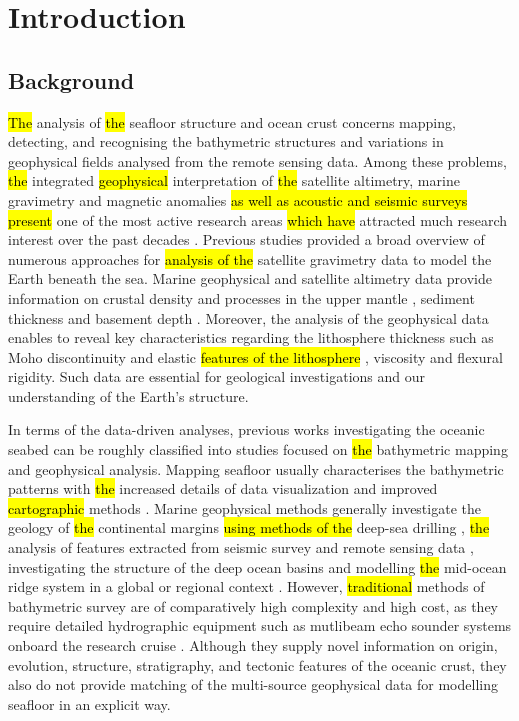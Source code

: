 \documentclass[geomatics,article,submit,pdftex,moreauthors]{Definitions/mdpi}
\begin{document}
\section{Introduction}

\subsection{Background}
\hl{The }analysis of \hl{the} seafloor structure and ocean crust concerns mapping, detecting, and recognising the bathymetric structures and variations in geophysical fields analysed from the remote sensing data. Among these problems, \hl{the }integrated \hl{geophysical} interpretation of \hl{the }satellite altimetry, marine gravimetry and magnetic anomalies \hl{as well as acoustic and seismic surveys present }one of the most active research areas \hl{which have} attracted much research interest over the past decades \cite{Bascou}. Previous studies \cite{ESHAGH2021313} provided a broad overview of numerous approaches for \hl{analysis of the} satellite gravimetry data to model the Earth beneath the sea. Marine geophysical and satellite altimetry data provide information on crustal density and processes in the upper mantle \cite{KAPAWAR2021106692,PENG2022110823,ZHANG202368}, sediment thickness and basement depth \cite{Lemenkova202005}. Moreover, the analysis of the geophysical data enables to reveal key characteristics regarding the lithosphere thickness such as Moho discontinuity and elastic \hl{features of the lithosphere} \cite{TESAURO201378}, viscosity and flexural rigidity. Such data are essential for geological investigations and our understanding of the Earth's structure.

In terms of the data-driven analyses, previous works investigating the oceanic seabed can be roughly classified into studies focused on \hl{the }bathymetric mapping and geophysical analysis. Mapping seafloor usually characterises the bathymetric patterns with \hl{the }increased\hl{ }details of data visualization and improved \hl{cartographic }methods \cite{Battista,Lemenkova202105,Lemenkova202012}. Marine geophysical methods generally investigate the geology of \hl{the }continental margins \hl{using methods of the} deep-sea drilling \cite{Schlich1992TheGA,Veevers1991a}, \hl{the }analysis of features extracted from seismic survey and remote sensing data \cite{NEGI2022229330}, investigating the structure of the deep ocean basins \cite{BENARD2010633,RAMANA2001241,DAVIS201616} and modelling \hl{the }mid-ocean ridge system in a global or regional context \cite{FREY200073,Sreejith,Lemenkova202112}. However, \hl{traditional }methods of bathymetric survey are of comparatively high complexity and high cost, as they require detailed hydrographic equipment such as mutlibeam echo sounder systems onboard the research cruise \cite{Falvey}. Although they supply novel information on origin, evolution, structure, stratigraphy, and tectonic features of the oceanic crust, they also do not provide matching of the multi-source geophysical data for modelling seafloor in an explicit way. 
\end{document}
